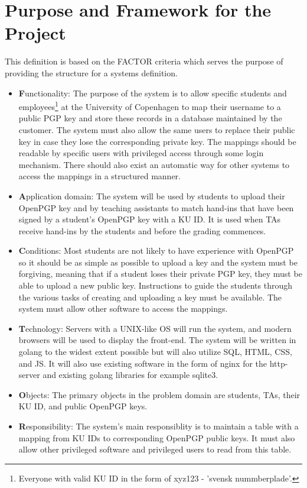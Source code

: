 \documentclass[11pt,a4paper]{report}
\begin{document}
\section{Purpose and Framework for the Project}\label{sec:Purpose_Framework}
This definition is based on the FACTOR criteria which serves the purpose of providing the structure for a systems definition.
\begin{itemize}
\item \textbf{F}unctionality: The purpose of the system is to allow specific students and employees\footnote{Everyone with valid KU ID in the form of xyz123 - 'svensk nummberplade'.} at the University of Copenhagen to map their username to a public PGP key and store these records in a database maintained by the customer. The system must also allow the same users to replace their public key in case they lose the corresponding private key. The mappings should be readable by specific users with privileged access through some login mechanism.
There should also exist an automatic way for other systems to access the mappings in a structured manner.
\item \textbf{A}pplication domain: The system will be used by students to upload their OpenPGP key and by teaching assistants to match hand-ins that have been signed by a student's OpenPGP key with a KU ID. It is used when TAs receive hand-ins by the students and before the grading commences.
\item \textbf{C}onditions: Most students are not likely to have experience with OpenPGP so it should be as simple as possible to upload a key and the system must be forgiving, meaning that if a student loses their private PGP key, they must be able to upload a new public key. Instructions to guide the students through the various tasks of creating and uploading a key must be available. The system must allow other software to access the mappings.
\item \textbf{T}echnology: Servers with a UNIX-like OS will run the system, and modern browsers will be used to display the front-end. The system will be written in golang to the widest extent possible but will also utilize SQL, HTML, CSS, and JS. It will also use existing software in the form of nginx for the http-server and existing golang libraries for example sqlite3.
\item \textbf{O}bjects: The primary objects in the problem domain are students, TAs, their KU ID, and public OpenPGP keys.
\item \textbf{R}esponsibility: The system's main responsiblity is to maintain a table with a mapping from KU IDs to corresponding OpenPGP public keys. It must also allow other privileged software and privileged users to read from this table.
\end{itemize}
\end{document}
